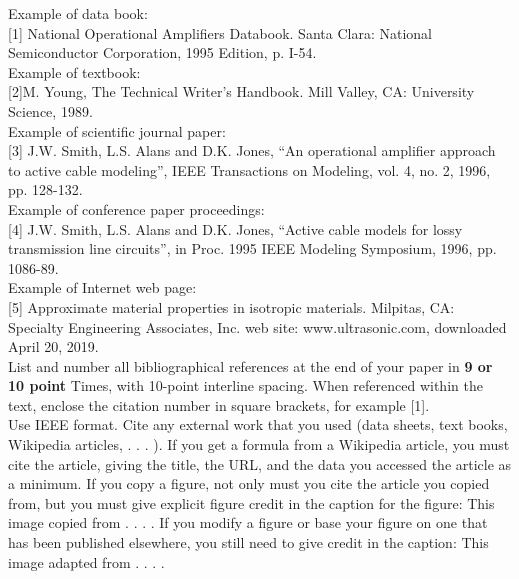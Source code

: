 \documentclass[journal]{IEEEtran}
\begin{document}
Example of data book:\\[0.1in]
[1] National Operational Amplifiers Databook. Santa Clara: National Semiconductor
Corporation, 1995 Edition, p. I-54. \\[0.1in]
Example of textbook: \\[0.1in]
[2]M. Young, The Technical Writer’s Handbook. Mill Valley, CA: University Science, 1989.\\[0.1in]
Example of scientific journal paper:\\[0.1in]
[3] J.W. Smith, L.S. Alans and D.K. Jones, “An operational amplifier approach to
active cable modeling”, IEEE Transactions on Modeling, vol. 4, no. 2, 1996, pp.
128-132.\\[0.1in]
Example of conference paper proceedings:\\[0.1in]
[4] J.W. Smith, L.S. Alans and D.K. Jones, “Active cable models for lossy
transmission line circuits”, in Proc. 1995 IEEE Modeling Symposium, 1996, pp.
1086-89.\\[0.1in]

Example of Internet web page:\\[0.1in]
[5] Approximate material properties in isotropic materials. Milpitas, CA: Specialty Engineering Associates, Inc. web site: www.ultrasonic.com, downloaded April 20, 2019.  \\[0.1in]

List and number all bibliographical 
references at the end of your paper in {\bf 9 or 10 point} Times, with 10-point interline spacing. When referenced within the text, enclose the citation number in square brackets, for example [1].\\[0.1in]
Use IEEE format. Cite any external work that you used (data sheets, text books, Wikipedia articles, . . . ). If you get a formula from a Wikipedia article, you must cite the article, giving the title, the URL, and the data you accessed the article as a minimum. If you copy a figure, not only must you cite the article you copied from, but you must give explicit figure credit in the caption for the figure: This image copied from . . . . If you modify a figure or base your figure on one that has been published elsewhere, you still need to give credit in the caption: This image adapted from . . . .
\end{document}

